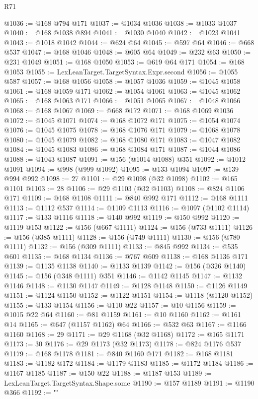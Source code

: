 \begin{lexlean}{R71}
\begin{coremodule}
@1036 := @168 @794 @171
@1037 := @1034 @1036
@1038 := @1033 @1037
@1040 := @168 @1038 @894
@1041 := @1030 @1040
@1042 := @1023 @1041
@1043 := @1018 @1042
@1044 := @624 @64
@1045 := @597 @64
@1046 := @668 @537
@1047 := @168 @1046
@1048 := @605 @64
@1049 := @232 @63
@1050 := @231 @1049
@1051 := @168 @1050
@1053 := @619 @64 @171
@1054 := @168 @1053
@1055 := LexLeanTarget.TargetSyntax.Expr.second
@1056 := @1055 @587
@1057 := @168 @1056
@1058 := @1057 @1036
@1059 := @1045 @1058
@1061 := @168 @1059 @171
@1062 := @1054 @1061
@1063 := @1045 @1062
@1065 := @168 @1063 @171
@1066 := @1051 @1065
@1067 := @1048 @1066
@1068 := @168 @1067
@1069 := @668 @172
@1071 := @168 @1069 @1036
@1072 := @1045 @1071
@1074 := @168 @1072 @171
@1075 := @1054 @1074
@1076 := @1045 @1075
@1078 := @168 @1076 @171
@1079 := @1068 @1078
@1080 := @1045 @1079
@1082 := @168 @1080 @171
@1083 := @1047 @1082
@1084 := @1045 @1083
@1086 := @168 @1084 @171
@1087 := @1044 @1086
@1088 := @1043 @1087
@1091 := @156 (@1014 @1088) @351
@1092 := @1012 @1091
@1094 := @998 (@999 @1092)
@1095 := @133 @1094
@1097 := @139 @994 @992
@1098 := 27
@1101 := @29 @1098 (@32 @1098)
@1102 := @165 @1101
@1103 := 28
@1106 := @29 @1103 (@32 @1103)
@1108 := @824 @1106 @171
@1109 := @168 @1108
@1111 := @840 @992 @171
@1112 := @168 @1111
@1113 := @1112 @537
@1114 := @1109 @1113
@1116 := @1097 (@1102 @1114)
@1117 := @133 @1116
@1118 := @140 @992
@1119 := @150 @992
@1120 := @1119 @153
@1122 := @156 (@667 @1111)
@1124 := @156 (@733 @1111)
@1126 := @156 (@385 @1111)
@1128 := @156 (@749 @1111)
@1130 := @156 (@780 @1111)
@1132 := @156 (@309 @1111)
@1133 := @845 @992
@1134 := @535 @601
@1135 := @168 @1134
@1136 := @767 @609
@1138 := @168 @1136 @171
@1139 := @1135 @1138
@1140 := @1133 @1139
@1142 := @156 (@326 @1140)
@1145 := @156 (@348 @1111) @351
@1146 := @1142 @1145
@1147 := @1132 @1146
@1148 := @1130 @1147
@1149 := @1128 @1148
@1150 := @1126 @1149
@1151 := @1124 @1150
@1152 := @1122 @1151
@1154 := @1118 (@1120 @1152)
@1155 := @133 @1154
@1156 := @110 @22
@1157 := @10 @1156
@1159 := @1015 @22 @64
@1160 := @81 @1159
@1161 := @10 @1160
@1162 := @1161 @14
@1165 := @647 (@1157 @1162) @64
@1166 := @532 @63
@1167 := @1166 @1160
@1168 := 29
@1171 := @29 @1168 (@32 @1168)
@1172 := @165 @1171
@1173 := 30
@1176 := @29 @1173 (@32 @1173)
@1178 := @824 @1176 @537
@1179 := @168 @1178
@1181 := @840 @1160 @171
@1182 := @168 @1181
@1183 := @1182 @172
@1184 := @1179 @1183
@1185 := @1172 @1184
@1186 := @1167 @1185
@1187 := @150 @22
@1188 := @1187 @153
@1189 := LexLeanTarget.TargetSyntax.Shape.some
@1190 := @157 @1189
@1191 := @1190 @366
@1192 := "{"
}
\end{coremodule}
\end{lexlean}
